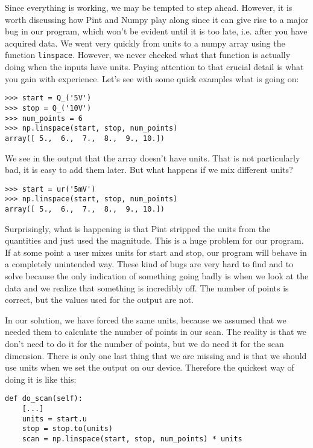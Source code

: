 {Since everything is working, we may be tempted to step ahead. However, it is worth discussing how Pint and Numpy play along since it can give rise to a major bug in our program, which won't be evident until it is too late, i.e. after you have acquired data. We went very quickly from units to a numpy array using the function \texttt{linspace}. However, we never checked what that function is actually doing when the inputs have units. Paying attention to that crucial detail is what you gain with experience. Let's see with some quick examples what is going on:

\begin{verbatim}
>>> start = Q_('5V')
>>> stop = Q_('10V')
>>> num_points = 6
>>> np.linspace(start, stop, num_points)
array([ 5.,  6.,  7.,  8.,  9., 10.])
\end{verbatim}

We see in the output that the array doesn't have units. That is not particularly bad, it is easy to add them later. But what happens if we mix different units?

\begin{verbatim}
>>> start = ur('5mV')
>>> np.linspace(start, stop, num_points)
array([ 5.,  6.,  7.,  8.,  9., 10.])
\end{verbatim}

Surprisingly, what is happening is that Pint stripped the units from the quantities and just used the magnitude. This is a huge problem for our program. If at some point a user mixes units for start and stop, our program will behave in a completely unintended way. These kind of bugs are very hard to find and to solve because the only indication of something going badly is when we look at the data and we realize that something is incredibly off. The number of points is correct, but the values used for the output are not. 

In our solution, we have forced the same units, because we assumed that we needed them to calculate the number of points in our scan. The reality is that we don't need to do it for the number of points, but we do need it for the scan dimension. There is only one last thing that we are missing and is that we should use units when we set the output on our device. Therefore the quickest way of doing it is like this:

\begin{verbatim}
def do_scan(self):
    [...]
    units = start.u
    stop = stop.to(units)
    scan = np.linspace(start, stop, num_points) * units
\end{verbatim}


}
